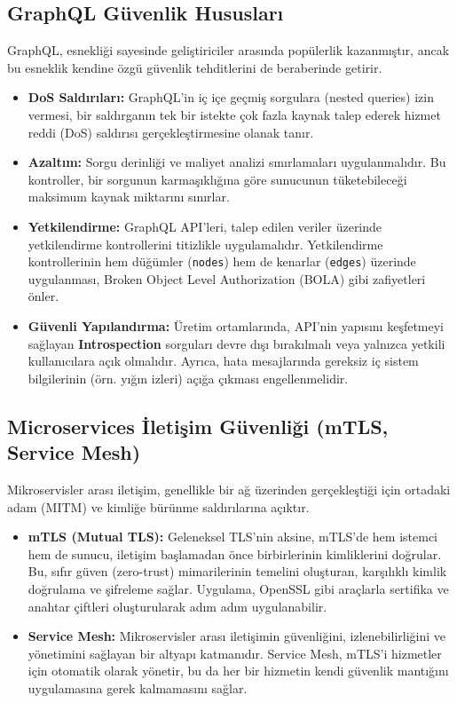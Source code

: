 \subsection{GraphQL Güvenlik Hususları}

GraphQL, esnekliği sayesinde geliştiriciler arasında popülerlik kazanmıştır, ancak bu esneklik kendine özgü güvenlik tehditlerini de beraberinde getirir.

\begin{itemize}
\item \textbf{DoS Saldırıları:} GraphQL'in iç içe geçmiş sorgulara (nested queries) izin vermesi, bir saldırganın tek bir istekte çok fazla kaynak talep ederek hizmet reddi (DoS) saldırısı gerçekleştirmesine olanak tanır.
\item \textbf{Azaltım:} Sorgu derinliği ve maliyet analizi sınırlamaları uygulanmalıdır. Bu kontroller, bir sorgunun karmaşıklığına göre sunucunun tüketebileceği maksimum kaynak miktarını sınırlar.
\item \textbf{Yetkilendirme:} GraphQL API'leri, talep edilen veriler üzerinde yetkilendirme kontrollerini titizlikle uygulamalıdır. Yetkilendirme kontrollerinin hem düğümler (\texttt{nodes}) hem de kenarlar (\texttt{edges}) üzerinde uygulanması, Broken Object Level Authorization (BOLA) gibi zafiyetleri önler.
\item \textbf{Güvenli Yapılandırma:} Üretim ortamlarında, API'nin yapısını keşfetmeyi sağlayan \textbf{Introspection} sorguları devre dışı bırakılmalı veya yalnızca yetkili kullanıcılara açık olmalıdır. Ayrıca, hata mesajlarında gereksiz iç sistem bilgilerinin (örn. yığın izleri) açığa çıkması engellenmelidir.
\end{itemize}

\subsection{Microservices İletişim Güvenliği (mTLS, Service Mesh)}

Mikroservisler arası iletişim, genellikle bir ağ üzerinden gerçekleştiği için ortadaki adam (MITM) ve kimliğe bürünme saldırılarına açıktır.

\begin{itemize}
\item \textbf{mTLS (Mutual TLS):} Geleneksel TLS'nin aksine, mTLS'de hem istemci hem de sunucu, iletişim başlamadan önce birbirlerinin kimliklerini doğrular. Bu, sıfır güven (zero-trust) mimarilerinin temelini oluşturan, karşılıklı kimlik doğrulama ve şifreleme sağlar. Uygulama, OpenSSL gibi araçlarla sertifika ve anahtar çiftleri oluşturularak adım adım uygulanabilir.
\item \textbf{Service Mesh:} Mikroservisler arası iletişimin güvenliğini, izlenebilirliğini ve yönetimini sağlayan bir altyapı katmanıdır. Service Mesh, mTLS'i hizmetler için otomatik olarak yönetir, bu da her bir hizmetin kendi güvenlik mantığını uygulamasına gerek kalmamasını sağlar.
\end{itemize}

